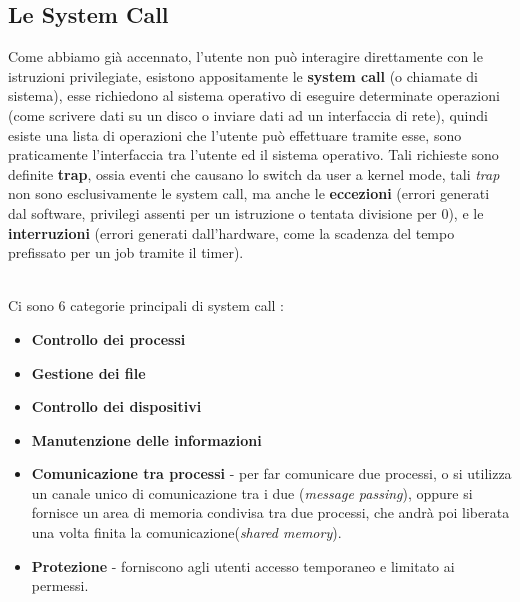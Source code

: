 \documentclass[12pt, letterpaper]{article}
\begin{document}
\subsection{Le System Call}
Come abbiamo già accennato, l'utente non può interagire direttamente con le istruzioni privilegiate, esistono 
appositamente le \textbf{system call} (o chiamate di sistema), esse richiedono al sistema operativo di eseguire 
determinate operazioni (come scrivere dati su un disco o inviare dati ad un interfaccia di rete), quindi esiste una 
lista di operazioni che l'utente può effettuare tramite esse, sono praticamente l'interfaccia tra l'utente ed il 
sistema operativo. Tali richieste sono definite \textbf{trap}, ossia eventi che causano lo switch da 
user a kernel mode, tali \textit{trap} non sono esclusivamente le system call, ma anche le 
\textbf{eccezioni} (errori generati dal software, privilegi assenti per un istruzione o tentata 
divisione per 0), e le \textbf{interruzioni} (errori generati dall'hardware, come la scadenza del tempo 
prefissato per un job tramite il timer).
\begin{figure}[h]
\end{figure}
\\Ci sono 6 categorie principali di system call :
\begin{itemize}
    \item \textbf{Controllo dei processi}
    \item \textbf{Gestione dei file}
    \item \textbf{Controllo dei dispositivi}
    \item \textbf{Manutenzione delle informazioni} 
    \item \textbf{Comunicazione tra processi} - per far comunicare due processi, o si utilizza un canale unico di 
    comunicazione tra i due (\textit{message passing}), oppure si fornisce un area di memoria condivisa tra due processi,
    che andrà poi liberata una volta finita la comunicazione(\textit{shared memory}).
    \item \textbf{Protezione} - forniscono agli utenti accesso temporaneo e limitato ai permessi.
\end{itemize}
\end{document}
